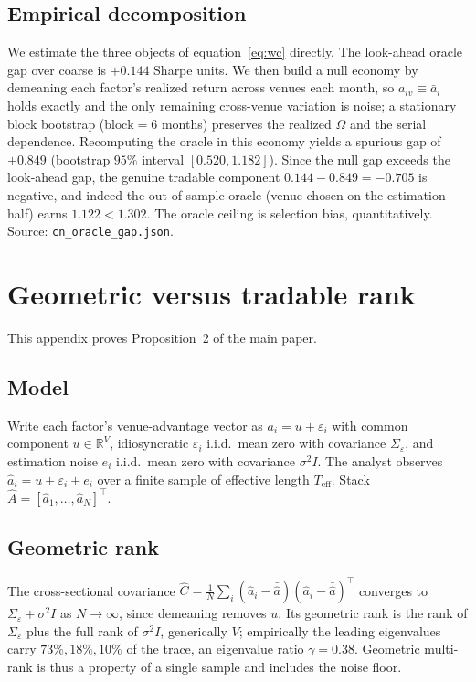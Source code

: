 \documentclass[12pt]{article}
\theoremstyle{plain}
\theoremstyle{definition}
\begin{document}
\subsection*{Empirical decomposition}
We estimate the three objects of equation~\eqref{eq:wc} directly. The
look-ahead oracle gap over coarse is $+0.144$ Sharpe units. We then build a null
economy by demeaning each factor's realized return across venues each month, so
$a_{iv}\equiv\bar a_i$ holds exactly and the only remaining cross-venue variation
is noise; a stationary block bootstrap ($\text{block}=6$ months) preserves the
realized $\Omega$ and the serial dependence. Recomputing the oracle in this
economy yields a spurious gap of $+0.849$ (bootstrap $95\%$ interval
$[0.520,1.182]$). Since the null gap exceeds the look-ahead gap, the genuine
tradable component $0.144-0.849=-0.705$ is negative, and indeed the
out-of-sample oracle (venue chosen on the estimation half) earns $1.122<1.302$.
The oracle ceiling is selection bias, quantitatively. Source:
\texttt{cn\_oracle\_gap.json}.

\section{Geometric versus tradable rank}
\label{ia:rank}

This appendix proves Proposition~2 of the main paper.

\subsection*{Model}
Write each factor's venue-advantage vector as $a_i=u+\varepsilon_i$ with common
component $u\in\mathbb{R}^V$, idiosyncratic $\varepsilon_i$ i.i.d.\ mean zero with
covariance $\Sigma_\varepsilon$, and estimation noise $e_i$ i.i.d.\ mean zero
with covariance $\sigma^2 I$. The analyst observes
$\widehat a_i=u+\varepsilon_i+e_i$ over a finite sample of effective length
$T_{\mathrm{eff}}$. Stack $\widehat A=[\widehat a_1,\dots,\widehat a_N]^\top$.

\subsection*{Geometric rank}
The cross-sectional covariance
$\widehat C=\tfrac1N\sum_i(\widehat a_i-\bar{\widehat a})(\widehat a_i-\bar{\widehat a})^\top$
converges to $\Sigma_\varepsilon+\sigma^2 I$ as $N\to\infty$, since demeaning
removes $u$. Its geometric rank is the rank of $\Sigma_\varepsilon$ plus the full
rank of $\sigma^2 I$, generically $V$; empirically the leading eigenvalues carry
$73\%,18\%,10\%$ of the trace, an eigenvalue ratio $\gamma=0.38$. Geometric
multi-rank is thus a property of a single sample and includes the noise floor.
\end{document}
